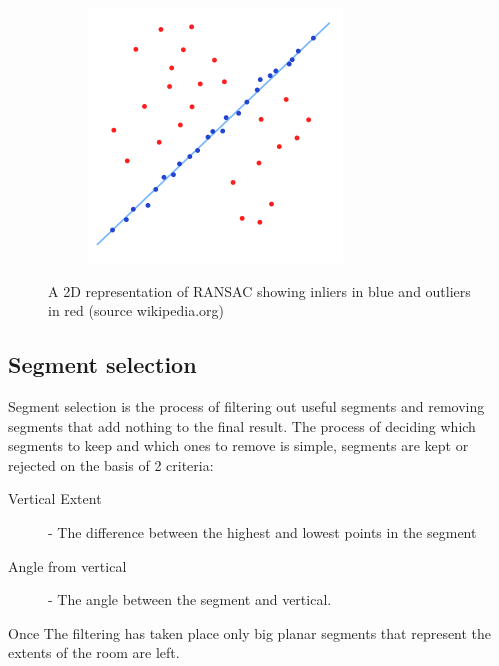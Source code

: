 \begin{figure}[H]
\begin{subfigure}{.5\textwidth}
						\includegraphics[width=1\linewidth]{Includes/images/random_sample_example2}
						\label{fig:RANSAC2}
					\end{subfigure}
					\caption{A 2D representation of RANSAC showing inliers in blue and outliers in red (source wikipedia.org)}
				\end{figure} 
			 
				
		\subsection{Segment selection}
			Segment selection is the process of filtering out useful segments and removing segments that add nothing to the final result. The process of deciding which segments to keep and which ones to remove is simple, segments are kept or rejected on the basis of 2 criteria:
			
			\begin{description}
				\item[Vertical Extent] - The  difference between the highest and lowest points in the segment
				\item[Angle from vertical] - The angle between the segment and vertical.
			\end{description}
			
			Once The filtering has taken place only big planar segments that represent the extents of the room are left.
			
